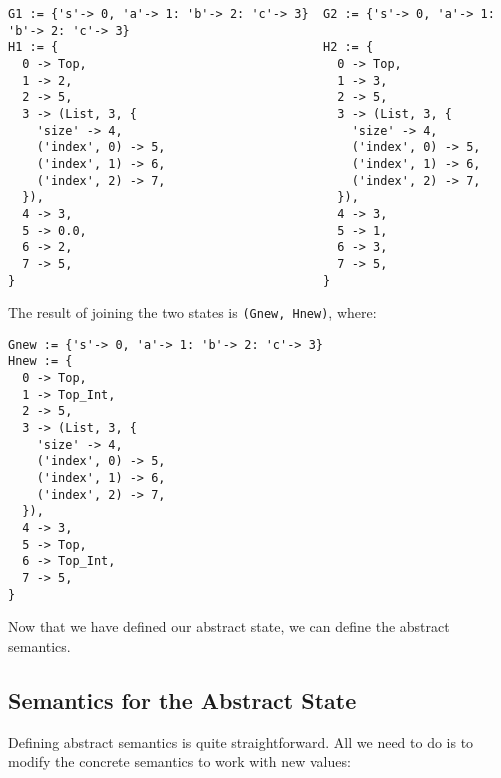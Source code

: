 \begin{verbatim}
G1 := {'s'-> 0, 'a'-> 1: 'b'-> 2: 'c'-> 3}  G2 := {'s'-> 0, 'a'-> 1: 'b'-> 2: 'c'-> 3}
H1 := {                                     H2 := {
  0 -> Top,                                   0 -> Top,
  1 -> 2,                                     1 -> 3,
  2 -> 5,                                     2 -> 5,
  3 -> (List, 3, {                            3 -> (List, 3, {
    'size' -> 4,                                'size' -> 4,
    ('index', 0) -> 5,                          ('index', 0) -> 5,
    ('index', 1) -> 6,                          ('index', 1) -> 6,
    ('index', 2) -> 7,                          ('index', 2) -> 7,
  }),                                         }),
  4 -> 3,                                     4 -> 3,
  5 -> 0.0,                                   5 -> 1,
  6 -> 2,                                     6 -> 3,
  7 -> 5,                                     7 -> 5,
}                                           }
\end{verbatim}

The result of joining the two states is \verb+(Gnew, Hnew)+, where:

\begin{verbatim}
Gnew := {'s'-> 0, 'a'-> 1: 'b'-> 2: 'c'-> 3}
Hnew := {
  0 -> Top,
  1 -> Top_Int,
  2 -> 5,
  3 -> (List, 3, {
    'size' -> 4,
    ('index', 0) -> 5,
    ('index', 1) -> 6,
    ('index', 2) -> 7,
  }),
  4 -> 3,
  5 -> Top,
  6 -> Top_Int,
  7 -> 5,
}
\end{verbatim}

Now that we have defined our abstract state, we can define the abstract semantics.

\subsection{Semantics for the Abstract State}

Defining abstract semantics is quite straightforward. All we need to do is to modify
the concrete semantics to work with new values:

